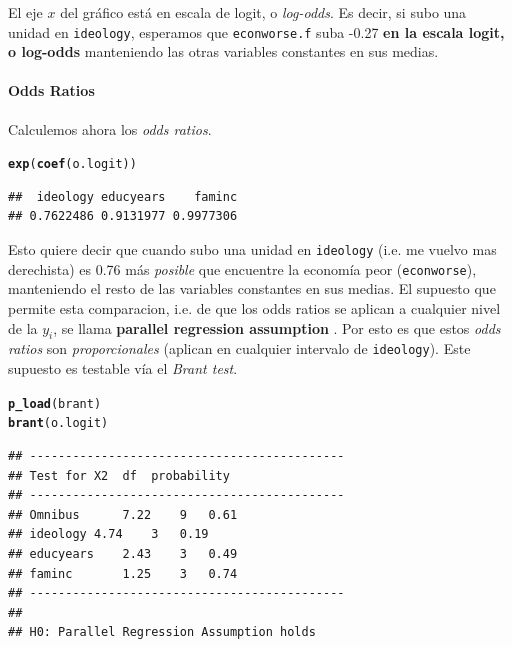 \documentclass[onesided]{article}\usepackage[]{graphicx}\usepackage[]{color}
\makeatletter
\newcommand{\hlstd}[1]{\textcolor[rgb]{0.345,0.345,0.345}{#1}}%
\newcommand{\hlkwd}[1]{\textcolor[rgb]{0.737,0.353,0.396}{\textbf{#1}}}%
\newenvironment{kframe}{%
 \def\at@end@of@kframe{}%
 \ifinner\ifhmode%
  \def\at@end@of@kframe{\end{minipage}}%
  \begin{minipage}{\columnwidth}%
 \fi\fi%
 \def\FrameCommand##1{\hskip\@totalleftmargin \hskip-\fboxsep
 \colorbox{shadecolor}{##1}\hskip-\fboxsep
     \hskip-\linewidth \hskip-\@totalleftmargin \hskip\columnwidth}%
 \MakeFramed {\advance\hsize-\width
   \@totalleftmargin\z@ \linewidth\hsize
   \@setminipage}}%
 {\par\unskip\endMakeFramed%
 \at@end@of@kframe}
\newenvironment{knitrout}{}{} %
\makeatother
\begin{document}
El eje $x$ del gr\'afico est\'a en escala de logit, o \emph{log-odds}. Es decir, si subo una unidad en \texttt{ideology}, esperamos que \texttt{econworse.f} suba  -0.27 {\bf en la escala logit, o log-odds} manteniendo las otras variables constantes en sus medias. 

\paragraph{Odds Ratios} Calculemos ahora los \emph{odds ratios}.


\begin{knitrout}
\color{fgcolor}\begin{kframe}
\begin{alltt}
\hlkwd{exp}\hlstd{(}\hlkwd{coef}\hlstd{(o.logit))}
\end{alltt}
\begin{verbatim}
##  ideology educyears    faminc 
## 0.7622486 0.9131977 0.9977306
\end{verbatim}
\end{kframe}
\end{knitrout}

Esto quiere decir que cuando subo una unidad en \texttt{ideology} (i.e. me vuelvo mas derechista) es 0.76 m\'as \emph{posible} que encuentre la econom\'ia peor (\texttt{econworse}), manteniendo el resto de las variables constantes en sus medias. El supuesto que permite esta comparacion, i.e. de que los odds ratios se aplican a cualquier nivel de la $y_{i}$, se llama {\bf parallel regression assumption} \parencite[140]{Long:1997wv}. Por esto es que estos \emph{odds ratios} son \emph{proporcionales} (aplican en cualquier intervalo de \texttt{ideology}). Este supuesto es testable v\'ia el \emph{Brant test}.

\begin{knitrout}
\color{fgcolor}\begin{kframe}
\begin{alltt}
\hlkwd{p_load}\hlstd{(brant)}
\hlkwd{brant}\hlstd{(o.logit)}
\end{alltt}
\begin{verbatim}
## -------------------------------------------- 
## Test for	X2	df	probability 
## -------------------------------------------- 
## Omnibus		7.22	9	0.61
## ideology	4.74	3	0.19
## educyears	2.43	3	0.49
## faminc		1.25	3	0.74
## -------------------------------------------- 
## 
## H0: Parallel Regression Assumption holds
\end{verbatim}
\end{kframe}
\end{knitrout}
\end{document}
